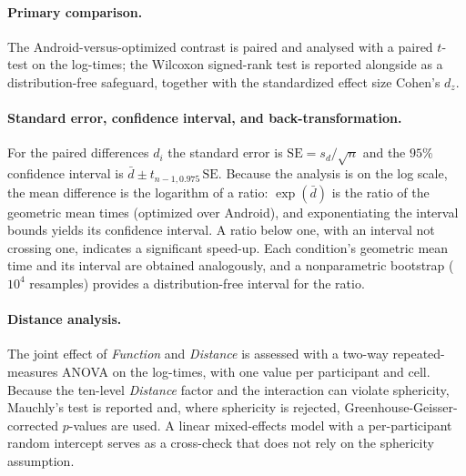 \documentclass[12pt,a4paper]{report}
\begin{document}
        \paragraph{Primary comparison.} The Android-versus-optimized contrast is paired and analysed with a paired $t$-test on the log-times; the Wilcoxon signed-rank test is reported alongside as a distribution-free safeguard, together with the standardized effect size Cohen's $d_z$.

        \paragraph{Standard error, confidence interval, and back-transformation.} For the paired differences $d_i$ the standard error is $\mathrm{SE}=s_d/\sqrt{n}$ and the $95\%$ confidence interval is $\bar d\pm t_{n-1,0.975}\,\mathrm{SE}$. Because the analysis is on the log scale, the mean difference is the logarithm of a ratio: $\exp(\bar d)$ is the ratio of the geometric mean times (optimized over Android), and exponentiating the interval bounds yields its confidence interval. A ratio below one, with an interval not crossing one, indicates a significant speed-up. Each condition's geometric mean time and its interval are obtained analogously, and a nonparametric bootstrap ($10^4$ resamples) provides a distribution-free interval for the ratio.

        \paragraph{Distance analysis.} The joint effect of \emph{Function} and \emph{Distance} is assessed with a two-way repeated-measures ANOVA on the log-times, with one value per participant and cell. Because the ten-level \emph{Distance} factor and the interaction can violate sphericity, Mauchly's test is reported and, where sphericity is rejected, Greenhouse-Geisser-corrected $p$-values are used. A linear mixed-effects model with a per-participant random intercept serves as a cross-check that does not rely on the sphericity assumption.
\end{document}
